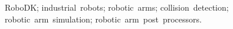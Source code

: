 ﻿%
RoboDK; industrial~robots; robotic~arms; collision~detection; \newline robotic~arm~simulation; robotic~arm~post~processors.


